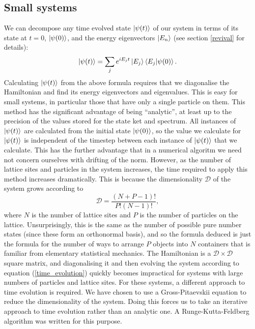 \documentclass[a4paper,10pt]{article}
\begin{document}
\subsection{Small systems}
We can decompose any time evolved state $\ket{\psi(t)}$ of our system in terms of its state at $t=0$, $\ket{\psi(0)}$, and the energy eigenvectors $\ket{E_n}$ (see section \ref{revival}
for details):
\begin{equation}
  \ket{\psi(t)}=\sum_je^{iE_{j}t}\ket{E_j}\braket{E_j|\psi(0)}.
\end{equation}
Calculating $\ket{\psi(t)}$ from the above formula requires that we diagonalise the Hamiltonian and find its energy eigenvectors and eigenvalues. This is easy for small systems, in particular
those that have only a single particle on them. This method has the significant advantage of being ``analytic'', at least up to the precision of the values stored for the state ket and spectrum.
 All instances of $\ket{\psi(t)}$ are calculated from the initial state $\ket{\psi(0)}$, so the value we calculate for $\ket{\psi(t)}$ is independent of the timestep between each instance of $\ket{\psi(t)}$ that we calculate. This has the further advantage that in a numerical
algoritm we need not concern ourselves with drifting of the norm. However, as the number of lattice sites and particles in the system increases, the time required to apply 
this method increases dramatically. This is because the dimensionality $\mathcal{D}$ of the system grows according to
\begin{equation}
 \mathcal{D}=\frac{\left(N+P-1\right)!}{P!\left(N-1\right)!}, \label{time_evolution}
\end{equation}
where $N$ is the number of lattice sites and $P$ is the number of particles on the lattice. Unsurprisingly, this is the same as the number of possible pure number states (since these form
an orthonormal basis), and so the formula deduced is just the formula for the number of ways to arrange $P$ objects into $N$ containers that is familiar from elementary statistical mechanics.
The Hamiltonian is a $\mathcal{D}\times\mathcal{D}$ square matrix, and diagonalising it and then evolving the system according to equation (\ref{time_evolution}) quickly becomes impractical 
for systems with large numbers of particles and lattice sites. For these systems, a different approach to time evolution is required. We have chosen to use a Gross-Pitaevskii equation to reduce
the dimensionality of the system. Doing this forces us to take an iterative approach to time evolution rather than an analytic one. A Runge-Kutta-Feldberg algorithm \cite{Burden2005} was written for this purpose.
\end{document}
